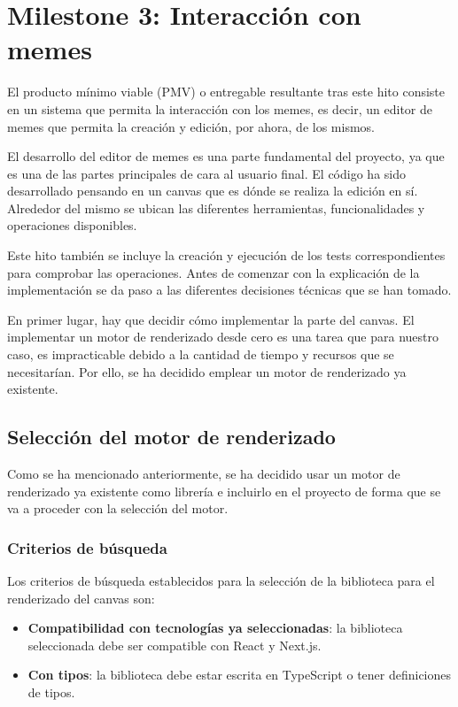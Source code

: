 \section{Milestone 3: Interacción con memes}

El producto mínimo viable (PMV) o entregable resultante tras este hito consiste en un sistema que permita la interacción con los memes, es decir, un editor de memes que permita la creación y edición, por ahora, de los mismos.

El desarrollo del editor de memes es una parte fundamental del proyecto, ya que es una de las partes principales de cara al usuario final. El código ha sido desarrollado pensando en un canvas que es dónde se realiza la edición en sí. Alrededor del mismo se ubican las diferentes herramientas, funcionalidades y operaciones disponibles.

Este hito también se incluye la creación y ejecución de los tests correspondientes para comprobar las operaciones. Antes de comenzar con la explicación de la implementación se da paso a las diferentes decisiones técnicas que se han tomado.

En primer lugar, hay que decidir cómo implementar la parte del canvas. El implementar un motor de renderizado desde cero es una tarea que para nuestro caso, es impracticable debido a la cantidad de tiempo y recursos que se necesitarían. Por ello, se ha decidido emplear un motor de renderizado ya existente.

\subsection{Selección del motor de renderizado}

Como se ha mencionado anteriormente, se ha decidido usar un motor de renderizado ya existente como librería e incluirlo en el proyecto de forma que se va a proceder con la selección del motor.

\subsubsection{Criterios de búsqueda}

Los criterios de búsqueda establecidos para la selección de la biblioteca para el renderizado del canvas son:

\begin{itemize}
    \item \textbf{Compatibilidad con tecnologías ya seleccionadas}: la biblioteca seleccionada debe ser compatible con React y Next.js.
    \item \textbf{Con tipos}: la biblioteca debe estar escrita en TypeScript o tener definiciones de tipos.
\end{itemize}

